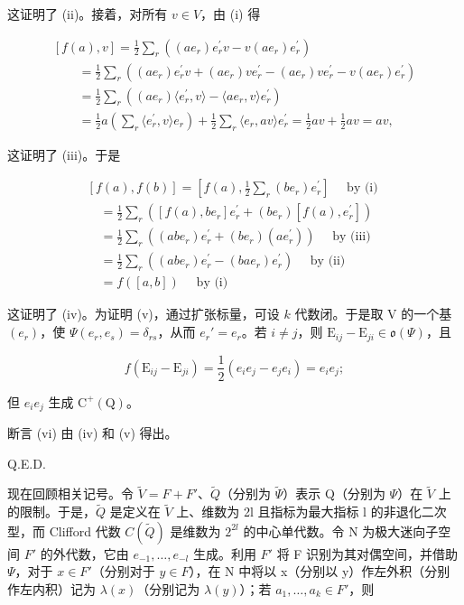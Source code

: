 这证明了 (ii)。接着，对所有 \(v \in V\)，由 (i) 得

\[
\begin{array}{l} [ f (a), v ] = \frac {1}{2} \sum_ {r} ((a e _ {r}) e _ {r} ^ {\prime} v - v (a e _ {r}) e _ {r} ^ {\prime}) \\ \qquad = \frac {1}{2} \sum_ {r} ((a e _ {r}) e _ {r} ^ {\prime} v + (a e _ {r}) v e _ {r} ^ {\prime} - (a e _ {r}) v e _ {r} ^ {\prime} - v (a e _ {r}) e _ {r} ^ {\prime}) \\ \qquad = \frac {1}{2} \sum_ {r} ((a e _ {r}) \langle e _ {r} ^ {\prime}, v \rangle - \langle a e _ {r}, v \rangle e _ {r} ^ {\prime}) \\ \qquad = \frac {1}{2} a \left(\sum_ {r} \langle e _ {r} ^ {\prime}, v \rangle e _ {r}\right) + \frac {1}{2} \sum_ {r} \langle e _ {r}, a v \rangle e _ {r} ^ {\prime} = \frac {1}{2} a v + \frac {1}{2} a v = a v, \end{array}
\]

这证明了 (iii)。于是

\[
\begin{array}{l} [ f (a), f (b) ] = \left[ f (a), \frac {1}{2} \sum_ {r} (b e _ {r}) e _ {r} ^ {\prime} \right] \quad \text { by   (i) } \\ \quad = \frac {1}{2} \sum_ {r} ([ f (a), b e _ {r} ] e _ {r} ^ {\prime} + (b e _ {r}) [ f (a), e _ {r} ^ {\prime} ]) \\ \quad = \frac {1}{2} \sum_ {r} ((a b e _ {r}) e _ {r} ^ {\prime} + (b e _ {r}) (a e _ {r} ^ {\prime})) \quad \text { by   (iii) } \\ \quad = \frac {1}{2} \sum_ {r} ((a b e _ {r}) e _ {r} ^ {\prime} - (b a e _ {r}) e _ {r} ^ {\prime}) \quad \text { by   (ii) } \\ \quad = f ([ a, b ]) \quad \text { by   (i) } \end{array}
\]

这证明了 (iv)。为证明 (v)，通过扩张标量，可设 \(k\) 代数闭。于是取 V 的一个基 \((e_r)\)，使 \(\varPsi(e_r, e_s) = \delta_{rs}\)，从而 \(e_r' = e_r\)。若 \(i \neq j\)，则 \(\mathrm{E}_{ij} - \mathrm{E}_{ji} \in \mathfrak{o}(\varPsi)\)，且

\[
f (\mathrm{E} _ {i j} - \mathrm{E} _ {j i}) = \frac {1}{2} (e _ {i} e _ {j} - e _ {j} e _ {i}) = e _ {i} e _ {j};
\]

但 \(e_{i}e_{j}\) 生成 \(\mathrm{C}^{+}(\mathrm{Q})\)。

断言 (vi) 由 (iv) 和 (v) 得出。

Q.E.D.

现在回顾相关记号。令 \(\tilde{V} = F + F'\)、\(\tilde{Q}\)（分别为 \(\tilde{\Psi}\)）表示 Q（分别为 \(\Psi\)）在 \(\tilde{V}\) 上的限制。于是，\(\tilde{Q}\) 是定义在 \(\tilde{V}\) 上、维数为 2l 且指标为最大指标 l 的非退化二次型，而 Clifford 代数 \(C(\tilde{Q})\) 是维数为 \(2^{2l}\) 的中心单代数。令 N 为极大迷向子空间 \(F'\) 的外代数，它由 \(e_{-1}, \ldots, e_{-l}\) 生成。利用 \(F'\) 将 F 识别为其对偶空间，并借助 \(\Psi\)，对于 \(x \in F'\)（分别对于 \(y \in F\)），在 N 中将以 x（分别以 y）作左外积（分别作左内积）记为 \(\lambda(x)\)（分别记为 \(\lambda(y)\)）；若 \(a_{1}, \ldots, a_{k} \in F'\)，则

